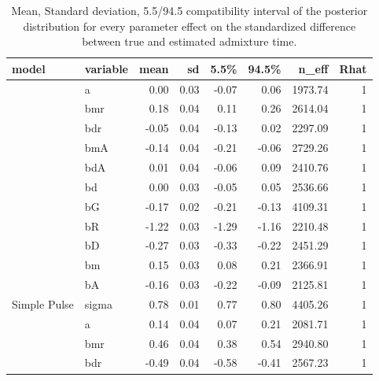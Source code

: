 \documentclass[11pt]{article}
\begin{document}
\begin{table}[H]

\caption{\label{tab:table_S1_EP_tm_td_and_SP_model_3}\label{tab:table_S1_EP_tm_td_and_SP_model_3} Mean, Standard deviation, 5.5/94.5 compatibility interval of the posterior distribution for every parameter effect on the standardized difference between true and estimated admixture time.}
\centering
\begin{tabular}[t]{l|l|r|r|r|r|r|r}
\hline
model & variable & mean & sd & 5.5\% & 94.5\% & n\_eff & Rhat\\
\hline
 & a & 0.00 & 0.03 & -0.07 & 0.06 & 1973.74 & 1\\

 & bmr & 0.18 & 0.04 & 0.11 & 0.26 & 2614.04 & 1\\

 & bdr & -0.05 & 0.04 & -0.13 & 0.02 & 2297.09 & 1\\

 & bmA & -0.14 & 0.04 & -0.21 & -0.06 & 2729.26 & 1\\

 & bdA & 0.01 & 0.04 & -0.06 & 0.09 & 2410.76 & 1\\

 & bd & 0.00 & 0.03 & -0.05 & 0.05 & 2536.66 & 1\\

 & bG & -0.17 & 0.02 & -0.21 & -0.13 & 4109.31 & 1\\

 & bR & -1.22 & 0.03 & -1.29 & -1.16 & 2210.48 & 1\\

 & bD & -0.27 & 0.03 & -0.33 & -0.22 & 2451.29 & 1\\

 & bm & 0.15 & 0.03 & 0.08 & 0.21 & 2366.91 & 1\\

 & bA & -0.16 & 0.03 & -0.22 & -0.09 & 2125.81 & 1\\

\multirow{-12}{*}{\raggedright\arraybackslash Simple Pulse} & sigma & 0.78 & 0.01 & 0.77 & 0.80 & 4405.26 & 1\\
\cline{1-8}
 & a & 0.14 & 0.04 & 0.07 & 0.21 & 2081.71 & 1\\

 & bmr & 0.46 & 0.04 & 0.38 & 0.54 & 2940.80 & 1\\

 & bdr & -0.49 & 0.04 & -0.58 & -0.41 & 2567.23 & 1\\


\end{tabular}
\end{table}
\end{document}
